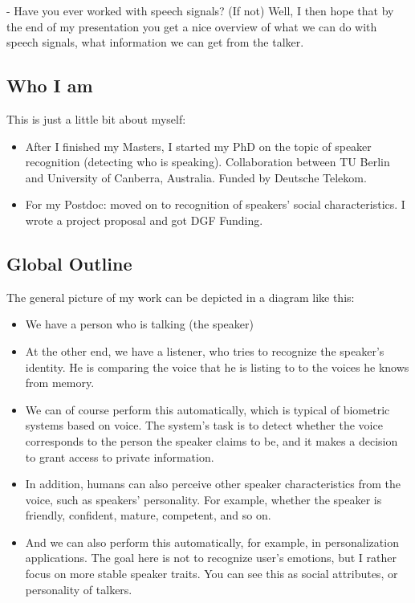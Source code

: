 \documentclass[a4paper]{article}
\begin{document}
- Have you ever worked with speech signals? (If not) Well, I then hope that by the end of my presentation you get a nice overview of what we can do with speech signals, what information we can get from the talker.

\subsection{Who I am}

This is just a little bit about myself:

\begin{itemize}
	
\item After I finished my Masters, I started my PhD on the topic of speaker recognition (detecting who is speaking). Collaboration between TU Berlin and University of Canberra, Australia. Funded by Deutsche Telekom.

\item For my Postdoc: moved on to recognition of speakers' social characteristics. I wrote  a project proposal and got DGF Funding.

\end{itemize}

\subsection{Global Outline}

The general picture of my work can be depicted in a diagram like this:

\begin{itemize}
	
\item We have a person who is talking (the speaker)

\item At the other end, we have a listener, who tries to recognize the speaker's identity. He is comparing the voice that he is listing to to the voices he knows from memory. 

\item We can of course perform this automatically, which is typical of biometric systems based on voice. The system's task is to detect whether the voice corresponds to the person the speaker claims to be, and it makes a decision to grant access to private information.

\item In addition, humans can also perceive other speaker characteristics from the voice, such as speakers' personality. For example, whether the speaker is friendly, confident, mature, competent, and so on.

\item And we can also perform this automatically, for example, in personalization applications. The goal here is not to recognize user's emotions, but I rather focus on more stable speaker traits. You can see this as social attributes, or personality of talkers.
 
\end{itemize}
\end{document}
